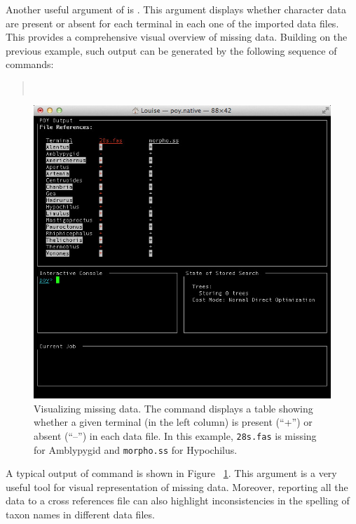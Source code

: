 {Another useful argument of  is . This argument displays whether 
character data are present or absent for each terminal in each one of the imported data files. This provides a 
comprehensive 
visual overview of missing data. Building on the previous example, such output can be generated by the following 
sequence of commands:
\begin{quote}
\\
\end{quote}

\begin{figure}[]
\begin{center}
\includegraphics[width=1.0\textwidth]{doc/figures/crossref.jpg}
\end{center}
\caption{Visualizing missing data. The command  displays a table showing whether 
a given terminal (in the left column) is present (``+'') or absent (``--'') in each data file. In this example, \texttt{28s.fas} 
is missing for Amblypygid and \texttt{morpho.ss} for Hypochilus.}
\label{fig:crossref}
\end{figure}

A typical output of  command is shown in Figure ~\ref{fig:crossref}. This argument 
is a very useful tool for visual representation of missing data. Moreover, reporting all the data to a cross references file 
can also highlight inconsistencies in the spelling of taxon names in different data files.


}
